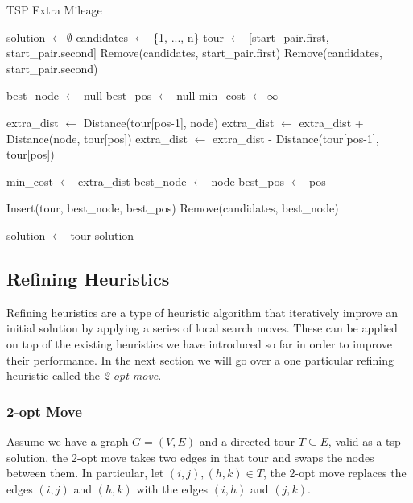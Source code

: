 \documentclass{article}
\begin{document}
\begin{algorithm}[!ht]
\caption{TSP Extra Mileage}
\begin{algorithmic}[1]
\State solution $\gets \emptyset$
\State candidates $\gets$ \{1, ..., n\} 
\State tour $\gets$ [start\_pair.first, start\_pair.second] 
\State Remove(candidates, start\_pair.first)
\State Remove(candidates, start\_pair.second)

    \State best\_node $\gets$ null
    \State best\_pos $\gets$ null
    \State min\_cost $\gets \infty$

            \State extra\_dist $\gets$ Distance(tour[pos-1], node)
            \State extra\_dist $\gets$ extra\_dist + Distance(node, tour[pos])
            \State extra\_dist $\gets$ extra\_dist - Distance(tour[pos-1], tour[pos])
            
                \State min\_cost $\gets$ extra\_dist
                \State best\_node $\gets$ node
                \State best\_pos $\gets$ pos
            \EndIf
        \EndFor
    \EndFor

    \State Insert(tour, best\_node, best\_pos)
    \State Remove(candidates, best\_node)
\EndWhile

\State solution $\gets$ tour
\State \Return solution
\EndProcedure
\end{algorithmic}
\end{algorithm}

\newpage

\subsection{Refining Heuristics}
Refining heuristics are a type of heuristic algorithm that iteratively improve an initial solution by applying a series of local search moves. These can be applied on top of the existing heuristics we have 
introduced so far in order to improve their performance. In the next section we will go over a one particular refining heuristic called the \textit{2-opt move}\cite{Heuristics_for_the_Traveling_Salesman_Problem}.

\subsubsection{2-opt Move}
Assume we have a graph $G = (V, E)$ and a directed tour $T \subseteq E$, valid as a tsp solution, 
the 2-opt move takes two edges in that tour and swaps the nodes 
between them.  In particular, let $(i, j), (h, k) \in T$, the 2-opt move replaces the edges $(i, j)$ and $(h, k)$ with the edges $(i, h)$ and $(j, k)$. \\
\\
\end{document}
